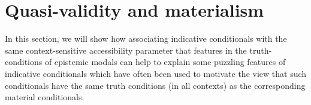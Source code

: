 \documentclass[If.tex]{subfiles}
\begin{document}
%



\section{Quasi-validity and materialism}
\label{sect:quasivalidity}
In this section, we will show how associating indicative conditionals with the same context-sensitive accessibility parameter that features in the truth-conditions of epistemic modals can help to explain some puzzling features of indicative conditionals which have often been used to motivate the view that such conditionals have the same truth conditions (in all contexts) as the corresponding material conditionals.  
\end{document}
